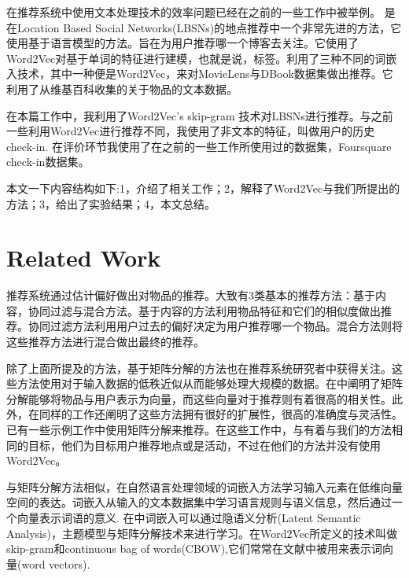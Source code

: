 \documentclass[UTF8]{ctexart}
\begin{document}
	在推荐系统中使用文本处理技术的效率问题已经在之前的一些工作\cite{gao2012exploring,shin2014recommending,musto1441word}中被举例。\cite{gao2012exploring} 是在Location Based Social Networks(LBSNs)的地点推荐中一个非常先进的方法，它使用基于语言模型的方法。\cite{shin2014recommending}旨在为用户推荐哪一个博客去关注。它使用了Word2Vec对基于单词的特征进行建模，也就是说，标签。\cite{musto1441word}利用了三种不同的词嵌入技术，其中一种便是Word2Vec，来对MovieLens与DBook数据集做出推荐。它利用了从维基百科收集的关于物品的文本数据。
	
	在本篇工作中，我利用了Word2Vec's skip-gram 技术对LBSNs进行推荐。与之前一些利用Word2Vec进行推荐不同\cite{shin2014recommending,musto1441word}，我使用了非文本的特征，叫做用户的历史check-in. 在评价环节我使用了在之前的一些工作\cite{ozsoy2014multi,gao2012exploring}所使用过的数据集，Foursquare check-in数据集。
	
	本文一下内容结构如下:1，介绍了相关工作；2，解释了Word2Vec与我们所提出的方法；3，给出了实验结果；4，本文总结。
	
	
	\section{Related Work}
	推荐系统通过估计偏好做出对物品的推荐\cite{massa2007trust,tavakolifard2012social}。大致有3类基本的推荐方法：基于内容，协同过滤与混合方法。基于内容的方法利用物品特征和它们的相似度做出推荐。协同过滤方法利用用户过去的偏好决定为用户推荐哪一个物品。混合方法则将这些推荐方法进行混合做出最终的推荐。
	
	除了上面所提及的方法，基于矩阵分解的方法也在推荐系统研究者中获得关注。这些方法使用对于输入数据的低秩近似从而能够处理大规模的数据\cite{ma2011recommender}。在\cite{koren2009matrix}中阐明了矩阵分解能够将物品与用户表示为向量，而这些向量对于推荐则有着很高的相关性。此外，在同样的工作还阐明了这些方法拥有很好的扩展性，很高的准确度与灵活性。已有一些示例工作\cite{ma2008sorec,zheng2010collaborative,liu2013soco,cheng2013you,lian2014geomf}中使用矩阵分解来推荐。在这些工作中，\cite{zheng2010collaborative}与\cite{cheng2013you}有着与我们的方法相同的目标，他们为目标用户推荐地点或是活动，不过在他们的方法并没有使用Word2Vec。
	
	与矩阵分解方法相似，在自然语言处理领域的词嵌入方法学习输入元素在低维向量空间的表达。词嵌入从输入的文本数据集中学习语言规则与语义信息，然后通过一个向量表示词语的意义\cite{musto1441word,arora2015random}. 在\cite{arora2015random}中词嵌入可以通过隐语义分析(Latent Semantic Analysis)，主题模型与矩阵分解技术来进行学习。在Word2Vec\cite{mikolov2013distributed}所定义的技术叫做skip-gram和continuous bag of words(CBOW),它们常常在文献中被用来表示词向量(word vectors).
	
\end{document}
